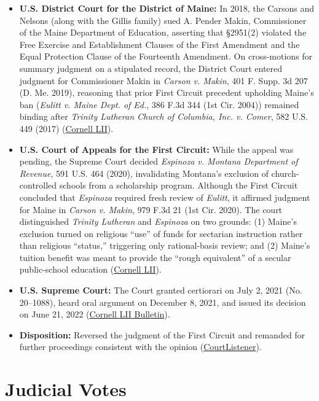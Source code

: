 \documentclass[12pt]{article}
\begin{document}
\begin{itemize}
  \item \textbf{U.S. District Court for the District of Maine:} In 2018, the Carsons and Nelsons (along with the Gillis family) sued A. Pender Makin, Commissioner of the Maine Department of Education, asserting that \S 2951(2) violated the Free Exercise and Establishment Clauses of the First Amendment and the Equal Protection Clause of the Fourteenth Amendment. On cross-motions for summary judgment on a stipulated record, the District Court entered judgment for Commissioner Makin in \textit{Carson v. Makin}, 401 F. Supp. 3d 207 (D. Me. 2019), reasoning that prior First Circuit precedent upholding Maine's ban (\textit{Eulitt v. Maine Dept. of Ed.}, 386 F.3d 344 (1st Cir. 2004)) remained binding after \textit{Trinity Lutheran Church of Columbia, Inc. v. Comer}, 582 U.S. 449 (2017) (\href{https://www.law.cornell.edu/supremecourt/text/20-1088}{Cornell LII}).
  \item \textbf{U.S. Court of Appeals for the First Circuit:} While the appeal was pending, the Supreme Court decided \textit{Espinoza v. Montana Department of Revenue}, 591 U.S. 464 (2020), invalidating Montana's exclusion of church-controlled schools from a scholarship program. Although the First Circuit concluded that \textit{Espinoza} required fresh review of \textit{Eulitt}, it affirmed judgment for Maine in \textit{Carson v. Makin}, 979 F.3d 21 (1st Cir. 2020). The court distinguished \textit{Trinity Lutheran} and \textit{Espinoza} on two grounds: (1) Maine's exclusion turned on religious ``use'' of funds for sectarian instruction rather than religious ``status,'' triggering only rational-basis review; and (2) Maine's tuition benefit was meant to provide the ``rough equivalent'' of a secular public-school education (\href{https://www.law.cornell.edu/supremecourt/text/20-1088}{Cornell LII}).
  \item \textbf{U.S. Supreme Court:} The Court granted certiorari on July 2, 2021 (No. 20--1088), heard oral argument on December 8, 2021, and issued its decision on June 21, 2022 (\href{https://www.law.cornell.edu/supct/cert/20-1088}{Cornell LII Bulletin}).
  \item \textbf{Disposition:} Reversed the judgment of the First Circuit and remanded for further proceedings consistent with the opinion (\href{https://www.courtlistener.com/opinion/6479298/carson-v-makin/}{CourtListener}).
\end{itemize}

\section{Judicial Votes}
\end{document}
